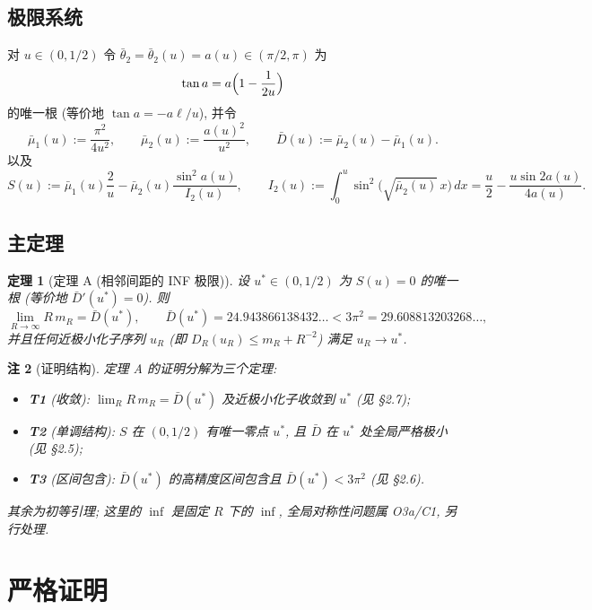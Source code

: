 \documentclass[UTF8]{ctexart}
\newtheorem{theorem}{定理}[section]
\newtheorem{remark}[theorem]{注}
\begin{document}
\subsection{极限系统}
对 $u\in(0,1/2)$ 令 $\bar\theta_2=\bar\theta_2(u)=a(u)\in(\pi/2,\pi)$ 为
\begin{equation}
	\tan a=a\Bigl(1-\frac1{2u}\Bigr)
\end{equation}
的唯一根 (等价地 $\tan a=-a\ell/u$), 并令
\begin{equation}
	\bar\mu_1(u):=\frac{\pi^2}{4u^2},\qquad
	\bar\mu_2(u):=\frac{a(u)^2}{u^2},\qquad
	\bar D(u):=\bar\mu_2(u)-\bar\mu_1(u).
\end{equation}
以及
\begin{equation}
	S(u):=\bar\mu_1(u)\frac2u-\bar\mu_2(u)\frac{\sin^2 a(u)}{I_2(u)},
	\qquad I_2(u):=\int_0^u\sin^2\bigl(\sqrt{\bar\mu_2(u)}\,x\bigr)\,dx
	=\frac u2-\frac{u\sin 2a(u)}{4a(u)}.
\end{equation}

\subsection{主定理}
\begin{theorem}[定理 A (相邻间距的 INF 极限)]
设 $u^*\in(0,1/2)$ 为 $S(u)=0$ 的唯一根 (等价地 $\bar D'(u^*)=0$). 则
\begin{equation}
	\lim_{R\to\infty} R\,m_R=\bar D(u^*),\qquad
	\bar D(u^*)=24.943866138432\ldots<3\pi^2=29.608813203268\ldots,
\end{equation}
并且任何近极小化子序列 $u_R$ (即 $D_R(u_R)\le m_R+R^{-2}$) 满足 $u_R\to u^*$.
\end{theorem}

\begin{remark}[证明结构]
定理 A 的证明分解为三个定理:
\begin{itemize}
	\item \textbf{T1} (收敛): $\lim_R R\,m_R=\bar D(u^*)$ 及近极小化子收敛到 $u^*$ (见 §2.7);
	\item \textbf{T2} (单调结构): $S$ 在 $(0,1/2)$ 有唯一零点 $u^*$, 且 $\bar D$ 在 $u^*$ 处全局严格极小 (见 §2.5);
	\item \textbf{T3} (区间包含): $\bar D(u^*)$ 的高精度区间包含且 $\bar D(u^*)<3\pi^2$ (见 §2.6).
\end{itemize}
其余为初等引理; 这里的 $\inf$ 是固定 $R$ 下的 $\inf$, 全局对称性问题属 O3a/C1, 另行处理.
\end{remark}

\section{严格证明}
\end{document}
